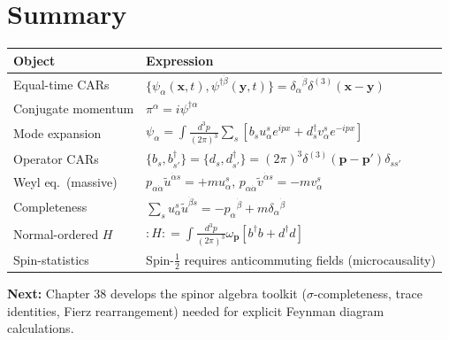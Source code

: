 \documentclass[12pt]{article}
\newcommand{\omegap}{\omega_{\mathbf{p}}}
\begin{document}
\section{Summary}

\begin{center}
\renewcommand{\arraystretch}{1.5}
\begin{tabular}{@{}ll@{}}
  \toprule
  Object & Expression \\
  \midrule
  Equal-time CARs & $\{\psi_\alpha(\mathbf{x},t),\psi^{\dagger\dot\beta}(\mathbf{y},t)\}
    = \delta_\alpha{}^{\dot\beta}\delta^{(3)}(\mathbf{x}-\mathbf{y})$ \\
  Conjugate momentum & $\pi^\alpha = i\psi^{\dagger\alpha}$ \\
  Mode expansion & $\psi_\alpha = \int\frac{d^3p}{(2\pi)^3}\sum_s
    [b_s u^s_\alpha e^{ipx} + d^\dagger_s v^s_\alpha e^{-ipx}]$ \\
  Operator CARs & $\{b_s,b^\dagger_{s'}\} = \{d_s,d^\dagger_{s'}\}
    = (2\pi)^3\delta^{(3)}(\mathbf{p}-\mathbf{p}')\delta_{ss'}$ \\
  Weyl eq.\ (massive) & $p_{\alpha\dot\alpha}\tilde u^{\dot\alpha s} = +m u^s_\alpha$,\quad
    $p_{\alpha\dot\alpha}\tilde v^{\dot\alpha s} = -m v^s_\alpha$ \\
  Completeness & $\sum_s u^s_\alpha\tilde u^{\dot\beta s} = -p_\alpha{}^{\dot\beta} + m\delta_\alpha{}^{\dot\beta}$ \\
  Normal-ordered $H$ & $:H: = \int\frac{d^3p}{(2\pi)^3}\omegap[b^\dagger b + d^\dagger d]$ \\
  Spin-statistics & Spin-$\frac{1}{2}$ requires anticommuting fields (microcausality) \\
  \bottomrule
\end{tabular}
\end{center}

\bigskip
\noindent\textbf{Next:} Chapter 38 develops the spinor algebra toolkit
($\sigma$-completeness, trace identities, Fierz rearrangement) needed for
explicit Feynman diagram calculations.
\end{document}
